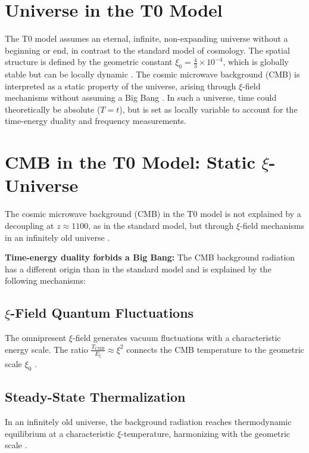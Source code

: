 \documentclass[12pt,a4paper]{article}
\begin{document}
	\section{Universe in the T0 Model}
	The T0 model assumes an eternal, infinite, non-expanding universe without a beginning or end, in contrast to the standard model of cosmology. The spatial structure is defined by the geometric constant \(\xi_0 = \frac{4}{3} \times 10^{-4}\), which is globally stable but can be locally dynamic \cite{pascher_t0_energie_2025}. The cosmic microwave background (CMB) is interpreted as a static property of the universe, arising through \(\xi\)-field mechanisms without assuming a Big Bang \cite{pascher_t0_cmb_2025}. In such a universe, time could theoretically be absolute (\( T = t \)), but is set as locally variable to account for the time-energy duality and frequency measurements.
	
	\section{CMB in the T0 Model: Static \(\xi\)-Universe}
	The cosmic microwave background (CMB) in the T0 model is not explained by a decoupling at \( z \approx 1100 \), as in the standard model, but through \(\xi\)-field mechanisms in an infinitely old universe \cite{pascher_t0_cmb_2025}.
	
	\textbf{Time-energy duality forbids a Big Bang:} The CMB background radiation has a different origin than in the standard model and is explained by the following mechanisms:
	
	\subsection{\(\xi\)-Field Quantum Fluctuations}
	The omnipresent \(\xi\)-field generates vacuum fluctuations with a characteristic energy scale. The ratio \( \frac{T_{\text{CMB}}}{E_\xi} \approx \xi^2 \) connects the CMB temperature to the geometric scale \(\xi_0\) \cite{pascher_t0_cmb_2025}.
	
	\subsection{Steady-State Thermalization}
	In an infinitely old universe, the background radiation reaches thermodynamic equilibrium at a characteristic \(\xi\)-temperature, harmonizing with the geometric scale \cite{pascher_t0_cmb_2025}.
	
\end{document}
